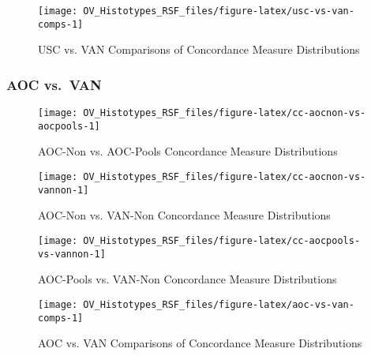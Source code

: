 \documentclass[
]{report}
\begin{document}
\begin{figure}[H]

{\centering \texttt{[image: OV\_Histotypes\_RSF\_files/figure-latex/usc-vs-van-comps-1]} 

}

\caption{USC vs. VAN Comparisons of Concordance Measure Distributions}\label{fig:usc-vs-van-comps}
\end{figure}

\hypertarget{aoc-vs.-van}{%
\subsubsection{AOC vs.~VAN}\label{aoc-vs.-van}}

\begin{figure}[H]

{\centering \texttt{[image: OV\_Histotypes\_RSF\_files/figure-latex/cc-aocnon-vs-aocpools-1]} 

}

\caption{AOC-Non vs. AOC-Pools Concordance Measure Distributions}\label{fig:cc-aocnon-vs-aocpools}
\end{figure}

\begin{figure}[H]

{\centering \texttt{[image: OV\_Histotypes\_RSF\_files/figure-latex/cc-aocnon-vs-vannon-1]} 

}

\caption{AOC-Non vs. VAN-Non Concordance Measure Distributions}\label{fig:cc-aocnon-vs-vannon}
\end{figure}

\begin{figure}[H]

{\centering \texttt{[image: OV\_Histotypes\_RSF\_files/figure-latex/cc-aocpools-vs-vannon-1]} 

}

\caption{AOC-Pools vs. VAN-Non Concordance Measure Distributions}\label{fig:cc-aocpools-vs-vannon}
\end{figure}

\begin{figure}[H]

{\centering \texttt{[image: OV\_Histotypes\_RSF\_files/figure-latex/aoc-vs-van-comps-1]} 

}

\caption{AOC vs. VAN Comparisons of Concordance Measure Distributions}\label{fig:aoc-vs-van-comps}
\end{figure}
\end{document}
